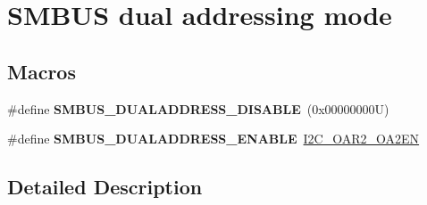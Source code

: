 \hypertarget{group___s_m_b_u_s__dual__addressing__mode}{}\section{S\+M\+B\+US dual addressing mode}
\label{group___s_m_b_u_s__dual__addressing__mode}
\subsection*{Macros}
\begin{DoxyCompactItemize}
\item 
\mbox{\label{group___s_m_b_u_s__dual__addressing__mode_gaf65eef4d4adc4ef07922f87e79c262ce}} 
\#define {\bfseries S\+M\+B\+U\+S\+\_\+\+D\+U\+A\+L\+A\+D\+D\+R\+E\+S\+S\+\_\+\+D\+I\+S\+A\+B\+LE}~(0x00000000\+U)
\item 
\mbox{\label{group___s_m_b_u_s__dual__addressing__mode_gada602d6b8322f768b80b130108642dbf}} 
\#define {\bfseries S\+M\+B\+U\+S\+\_\+\+D\+U\+A\+L\+A\+D\+D\+R\+E\+S\+S\+\_\+\+E\+N\+A\+B\+LE}~\hyperlink{group___peripheral___registers___bits___definition_gaa6ec62ffdf8a682e5e0983add8fdfa26}{I2\+C\+\_\+\+O\+A\+R2\+\_\+\+O\+A2\+EN}
\end{DoxyCompactItemize}


\subsection{Detailed Description}
